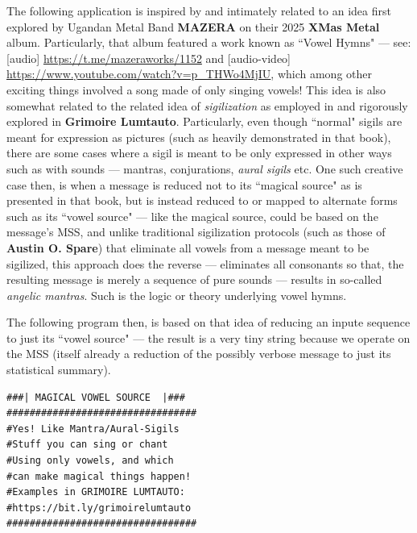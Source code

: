 \documentclass[a4paper, 18pt]{book} %
\begin{document}
{{{The following application is inspired by and intimately related to an idea first explored by Ugandan Metal Band \textbf{MAZERA} on their 2025 \textbf{XMas Metal} album. Particularly, that album featured a work known as ``Vowel Hymns" --- see: [audio] \url{https://t.me/mazeraworks/1152} and [audio-video] \url{https://www.youtube.com/watch?v=p_THWo4MjIU}, which among other exciting things involved a song made of only singing vowels! This idea is also somewhat related to the related idea of \textit{sigilization} as employed in and rigorously explored in \textbf{Grimoire Lumtauto}\cite{lutalo_2025_grimlumtauto}. Particularly, even though ``normal" sigils are meant for expression as pictures (such as heavily demonstrated in that book), there are some cases where a sigil is meant to be only expressed in other ways such as with sounds --- mantras, conjurations, \textit{aural sigils} etc. One such creative case then, is when a message is reduced not to its ``magical source" as is presented in that book, but is instead reduced to or mapped to alternate forms such as its ``vowel source" --- like the magical source, could be based on the message's MSS, and unlike traditional sigilization protocols (such as those of \textbf{Austin O. Spare}) that eliminate all vowels from a message meant to be sigilized, this approach does the reverse --- eliminates all consonants so that, the resulting message is merely a sequence of pure sounds --- results in so-called \textit{angelic mantras}. Such is the logic or theory underlying vowel hymns. 


\vspace{2em}

The following program then, is based on that idea of reducing an inpute sequence to just its ``vowel source" --- the result is a very tiny string because we operate on the MSS (itself already a reduction of the possibly verbose message to just its statistical summary).
 

   \vspace{1em}

  \begin{tcolorbox}[teaterminalstyle, title=TEA Application: MAGICAL VOWEL SOURCE GENERATOR, breakable]
  \begin{lstlisting}[language=TEA,breaklines=true,]
###| MAGICAL VOWEL SOURCE  |###
#################################
#Yes! Like Mantra/Aural-Sigils
#Stuff you can sing or chant
#Using only vowels, and which
#can make magical things happen!
#Examples in GRIMOIRE LUMTAUTO:
#https://bit.ly/grimoirelumtauto
#################################


\end{lstlisting}
\end{tcolorbox}}}}
\end{document}

